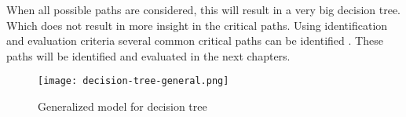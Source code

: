 When all possible paths are considered, this will result in a very big decision tree. Which does not result in more insight in the critical paths. Using identification and evaluation criteria several common critical paths can be identified . These paths will be identified and evaluated in the next chapters.

\begin{figure}[p]
	\centering
	\texttt{[image: decision-tree-general.png]}
	\caption{Generalized model for decision tree}
	\label{fig:decision-tree-general}
\end{figure}

